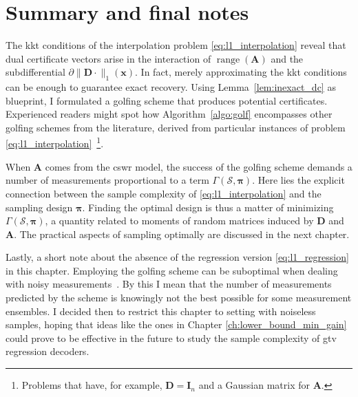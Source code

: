 \section{Summary and final notes}

The \acrfull{kkt} conditions of the interpolation problem \eqref{eq:l1_interpolation} reveal that dual certificate vectors arise in the interaction of $\operatorname{range} \left( \mathbf{A} \right)$ and the subdifferential $\partial \|\mathbf{D} \cdot \|_1 (\mathbf{x})$. In fact, merely approximating the \acrshort{kkt} conditions can be enough to guarantee exact recovery. Using Lemma~\ref{lem:inexact_dc} as blueprint, I formulated a golfing scheme that produces potential certificates. Experienced readers might spot how Algorithm~\ref{algo:golf} encompasses other golfing schemes from the literature, derived from particular instances of problem \eqref{eq:l1_interpolation}~\footnote{Problems that have, for example, $\mathbf{D} = \mathbf{I}_n$ and a Gaussian matrix for $\mathbf{A}$.}.

When $\mathbf{A}$ comes from the \acrshort{cswr} model, the success of the golfing scheme demands a number of measurements proportional to a term $\Gamma(\mathcal{S}, \bm{\pi})$. Here lies the explicit connection between the sample complexity of \eqref{eq:l1_interpolation} and the sampling design $\bm{\pi}$. Finding the optimal design is thus a matter of minimizing $\Gamma(\mathcal{S}, \bm{\pi})$, a quantity related to moments of random matrices induced by $\mathbf{D}$ and $\mathbf{A}$. The practical aspects of sampling optimally are discussed in the next chapter.

Lastly, a short note about the absence of the regression version \eqref{eq:l1_regression} in this chapter. Employing the golfing scheme can be suboptimal when dealing with noisy measurements~\cite{krahmer2019}. By this I mean that the number of measurements predicted by the scheme is knowingly not the best possible for some measurement ensembles. I decided then to restrict this chapter to setting with noiseless samples, hoping that ideas like the ones in Chapter \ref{ch:lower_bound_min_gain} could prove to be effective in the future to study the sample complexity of \acrshort{gtv} regression decoders.

\clearpage

